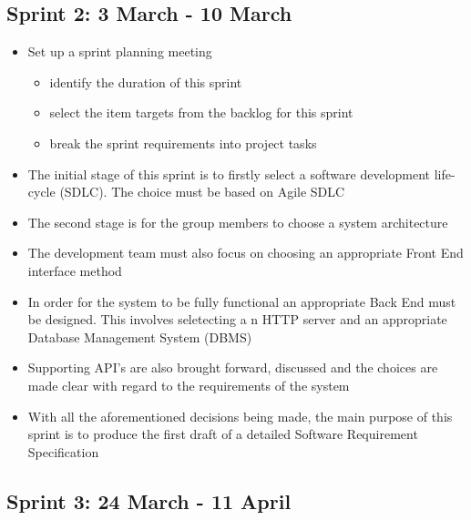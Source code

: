 \documentclass[10pt, a4paper, onecolumn]{scrartcl}
\begin{document}
		\subsection{Sprint 2: 3 March - 10 March}
		
			\begin{itemize}[noitemsep]
				\item Set up a sprint planning meeting
					\begin{itemize}
						\item identify the duration of this sprint
						\item select the item targets from the backlog for this sprint
						\item break the sprint requirements into project tasks
					\end{itemize}
				\item The initial stage of this sprint is to firstly select a software development life-cycle (SDLC). The choice must be based on Agile SDLC
				\item The second stage is for the group members to choose a system architecture
				\item The development team must also focus on choosing an appropriate Front End interface method
				\item In order for the system to be fully functional an appropriate Back End must be designed. This involves seletecting a n HTTP server and an appropriate Database Management System (DBMS)
				\item Supporting API's are also brought forward, discussed and the choices are made clear with regard to the requirements of the system
				\item With all the aforementioned decisions being made, the main purpose of this sprint is to produce the first draft of a detailed Software Requirement Specification
				
			\end{itemize}
		
		\subsection{Sprint 3: 24 March - 11 April}
				
\end{document}
